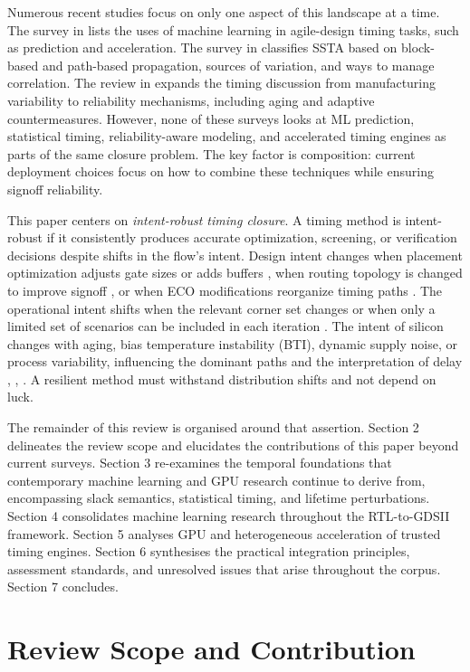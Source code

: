 \documentclass[num-refs]{wiley-article}
\begin{document}
  Numerous recent studies focus on only one aspect of this landscape at a time. The survey in \cite{ref20} lists the uses of machine learning in agile-design timing tasks, such as prediction and acceleration. The survey in \cite{ref49} classifies SSTA based on block-based and path-based propagation, sources of variation, and ways to manage correlation. The review in \cite{ref39} expands the timing discussion from manufacturing variability to reliability mechanisms, including aging and adaptive countermeasures. However, none of these surveys looks at ML prediction, statistical timing, reliability-aware modeling, and accelerated timing engines as parts of the same closure problem. The key factor is composition: current deployment choices focus on how to combine these techniques while ensuring signoff reliability.


  This paper centers on \emph{intent-robust timing closure}. A timing method is intent-robust if it consistently produces accurate optimization, screening, or verification decisions despite shifts in the flow's intent. Design intent changes when placement optimization adjusts gate sizes or adds buffers \cite{ref1}, when routing topology is changed to improve signoff \cite{ref7}, or when ECO modifications reorganize timing paths \cite{ref19}. The operational intent shifts when the relevant corner set changes or when only a limited set of scenarios can be included in each iteration \cite{ref16}. The intent of silicon changes with aging, bias temperature instability (BTI), dynamic supply noise, or process variability, influencing the dominant paths and the interpretation of delay \cite{ref12}, \cite{ref15}, \cite{ref44}. A resilient method must withstand distribution shifts and not depend on luck.


  The remainder of this review is organised around that assertion. Section 2 delineates the review scope and elucidates the contributions of this paper beyond current surveys. Section 3 re-examines the temporal foundations that contemporary machine learning and GPU research continue to derive from, encompassing slack semantics, statistical timing, and lifetime perturbations. Section 4 consolidates machine learning research throughout the RTL-to-GDSII framework. Section 5 analyses GPU and heterogeneous acceleration of trusted timing engines. Section 6 synthesises the practical integration principles, assessment standards, and unresolved issues that arise throughout the corpus. Section 7 concludes.


  \section{Review Scope and Contribution}
\end{document}

